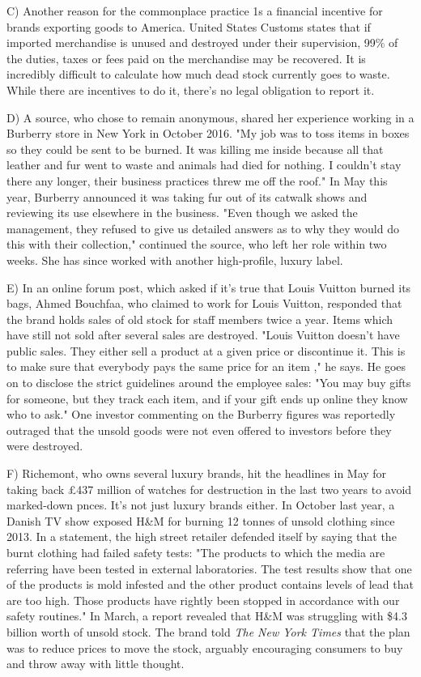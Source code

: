 \documentclass[UTF8,11pt]{ctexart}
\begin{document}
C) Another reason for the commonplace practice 1s a financial incentive for brands exporting goods to America. United States Customs states that if imported merchandise is unused and destroyed under their supervision, 99\% of the duties, taxes or fees paid on the merchandise may be recovered. It is incredibly difficult to calculate how much dead stock currently goes to waste. While there are incentives to do it, there's no legal obligation to report it.


D) A source, who chose to remain anonymous, shared her experience working in a Burberry store in New York in October 2016. "My job was to toss items in boxes so they could be sent to be burned. It was killing me inside because all that leather and fur went to waste and animals had died for nothing. I couldn't stay there any longer, their business practices threw me off the roof." In May this year, Burberry announced it was taking fur out of its catwalk shows and reviewing its use elsewhere in the business. "Even though we asked the management, they refused to give us detailed answers as to why they would do this with their collection," continued the source, who left her role within two weeks. She has since worked with another high-profile, luxury label.


E) In an online forum post, which asked if it's true that Louis Vuitton burned its bags, Ahmed Bouchfaa, who claimed to work for Louis Vuitton, responded that the brand holds sales of old stock for staff members twice a year. Items which have still not sold after several sales are destroyed. "Louis Vuitton doesn't have public sales. They either sell a product at a given price or discontinue it. This is to make sure that everybody pays the same price for an item ," he says. He goes on to disclose the strict guidelines around the employee sales: "You may buy gifts for someone, but they track each item, and if your gift ends up online they know who to ask." One investor commenting on the Burberry figures was reportedly outraged that the unsold goods were not even offered to investors before they were destroyed.


F) Richemont, who owns several luxury brands, hit the headlines in May for taking back £437 million of watches for destruction in the last two years to avoid marked-down pnces. It's not just luxury brands either. In October last year, a Danish TV show exposed H\&M for burning 12 tonnes of unsold clothing since 2013. In a statement, the high street retailer defended itself by saying that the burnt clothing had failed safety tests: "The products to which the media are referring have been tested in external laboratories. The test results show that one of the products is mold infested and the other product contains levels of lead that are too high. Those products have rightly been stopped in accordance with our safety routines." In March, a report revealed that H\&M was struggling with \$4.3 billion worth of unsold stock. The brand told \textit{The New York Times }that the plan was to reduce prices to move the stock, arguably encouraging consumers to buy and throw away with little thought.
\end{document}
